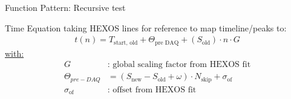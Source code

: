 \documentclass{beamer}
\newcommand{\ix}[1]{_\text{#1}}
\begin{document}
    \begin{frame}{Function Pattern: Recursive test}
        \begin{block}{Time Equation}
        taking HEXOS lines for reference to map timeline/peaks to:%
            \begin{align}%
                t\left(n\right)=%
                    T\ix{start, old}+\Theta\ix{pre DAQ}+%
                    \left(S\ix{old}\right)\cdot n\cdot G\nonumber%
            \end{align}%
            \quad\quad\underline{with:}%
            \begin{align}%
                G&\text{: global scaling factor from HEXOS fit}\nonumber\\%
                \Theta_{pre-DAQ}&=%
                    \left(S\ix{new}-S\ix{old}+\omega\right)%
                    \cdot N\ix{skip}+\sigma\ix{of}\nonumber\\%
                \sigma\ix{of}&\text{: offset from HEXOS fit}\nonumber%
            \end{align}
        \end{block}
    \end{frame}%
\end{document}
